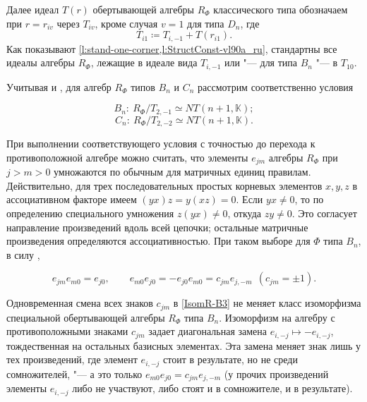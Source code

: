 \documentclass[a4paper,14pt,oneside,openany]{memoir}
\begin{document}
\medskip

Далее идеал $T(r)$ обертывающей алгебры $R_{\Phi}$ классического типа
обозначаем при $r=r_{iv}$ через $T_{iv}$, кроме случая $v=1$ для типа $D_n$,
где
\[
    T_{i1}\coloneq T_{i,-1}+T(r_{i1}).
\]
Как показывают \cref{l:stand-one-corner,l:StructConst-vl90a_ru}, стандартны все
идеалы алгебры $R_{\Phi}$, лежащие в идеале вида $T_{i,-1}$ или "--- для типа
$B_n$ "--- в $T_{1 0}$.

Учитывая  и , для алгебр
$R_{\Phi}$ типов $B_n$ и $C_n$ рассмотрим соответственно условия

\begin{equation}\label{IsomR-Bn}
    B_n:\ R_{\Phi}/T_{2,-1}\simeq NT(n+1,\mathbb{K});
\end{equation}
\begin{equation}\label{IsomR-Cn}
    C_n:\ R_{\Phi}/T_{2,-2}\simeq NT(n+1,\mathbb{K}).
\end{equation}

При выполнении соответствующего условия с точностью до перехода к
противоположной алгебре можно считать, что элементы $e_{jm}$ алгебры $R_{\Phi}$
при $j>m>0$ умножаются по обычным для матричных единиц правилам. Действительно,
для трех последовательных простых корневых элементов $x,y,z$ в ассоциативном
факторе имеем $(yx)z=y(xz)=0$. Если $yx\ne0$, то по определению специального
умножения $z(yx)\ne0$, откуда $zy\ne0$. Это согласует направление произведений
вдоль всей цепочки; остальные матричные произведения определяются
ассоциативностью. При таком выборе для ${\Phi}$ типа $B_n$, в силу
,

\begin{equation}\label{IsomR-B3}
    e_{jm}e_{m0}=e_{j0},\qquad e_{m0}e_{j0}=- e_{j0}e_{m0}=c_{jm}
    e_{j,-m}\ \ (c_{jm}=\pm 1).
\end{equation}

\begin{remark}\label{remark:RBn-sign}
    Одновременная смена всех знаков $c_{jm}$ в \eqref{IsomR-B3} не меняет класс
    изоморфизма специальной обертывающей алгебры $R_\Phi$ типа $B_n$. Изоморфизм на
    алгебру с противоположными знаками $c_{jm}$ задает диагональная замена
    $e_{i,-j}\mapsto -e_{i,-j}$, тождественная на остальных базисных элементах. Эта
    замена меняет знак лишь у тех произведений, где элемент $e_{i,-j}$ стоит в
    результате, но не среди сомножителей, "--- а это только
    $e_{m0}e_{j0}=c_{jm}e_{j,-m}$ (у прочих произведений элементы $e_{i,-j}$ либо
    не участвуют, либо стоят и в сомножителе, и в результате).
\end{remark}
\end{document}
